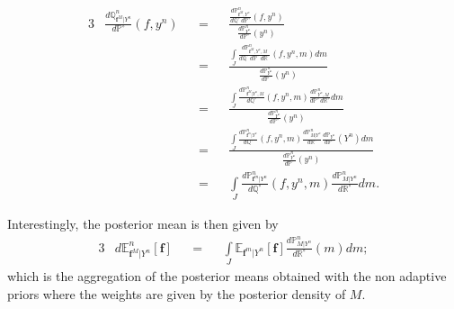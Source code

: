 \begin{alignat*}{3}
&\frac{d\mathds{Q}_{\boldsymbol{f}^{M} \vert Y^{n}}^{n}}{d\mathds{P}^{\circ}}(f, y^{n}) &&=&& \frac{\frac{d\mathds{P}_{\boldsymbol{f}^{M}, Y^{n}}^{n}}{d\mathds{Q}^{\circ} \, d\mathds{P}^{\circ}}(f, y^{n})}{\frac{d\mathds{P}_{Y^{n}}^{n}}{d \mathds{P}^{\circ}}(y^{n})}\\
& &&=&& \frac{\int\limits_{J} \frac{d\mathds{P}_{\boldsymbol{f}^{M}, Y^{n}, M}^{n}}{d\mathds{Q}^{\circ} \, d\mathds{P}^{\circ} \, d\mathds{R}^{\circ}}(f, y^{n}, m) dm}{\frac{d\mathds{P}_{Y^{n}}^{n}}{d \mathds{P}^{\circ}}(y^{n})}\\
& &&=&& \frac{\int\limits_{J} \frac{d\mathds{P}_{\boldsymbol{f}^{M} \vert Y^{n}, M}^{n}}{d\mathds{Q}^{\circ}}(f, y^{n}, m) \frac{d\mathds{P}_{Y^{n}, M}^{n}}{d\mathds{P}^{\circ} \, d\mathds{R}^{\circ}} dm}{\frac{d\mathds{P}_{Y^{n}}^{n}}{d \mathds{P}^{\circ}}(y^{n})}\\
& &&=&& \frac{\int\limits_{J} \frac{d\mathds{P}_{\boldsymbol{f}^{m} \vert Y^{n}}^{n}}{d\mathds{Q}^{\circ}}(f, y^{n}, m) \frac{d\mathds{P}_{M \vert Y^{n}}^{n}}{d\mathds{R}^{\circ}} \frac{d\mathds{P}_{Y^{n}}}{d\mathds{P}^{\circ}}(Y^{n}) dm}{\frac{d\mathds{P}_{Y^{n}}^{n}}{d \mathds{P}^{\circ}}(y^{n})}\\
& &&=&& \int\limits_{J} \frac{d\mathds{P}_{\boldsymbol{f}^{m} \vert Y^{n}}^{n}}{d\mathds{Q}^{\circ}}(f, y^{n}, m) \frac{d\mathds{P}_{M \vert Y^{n}}^{n}}{d\mathds{R}^{\circ}} dm.
\end{alignat*}

Interestingly, the posterior mean is then given by
\begin{alignat*}{3}
&d\mathds{E}_{\boldsymbol{f}^{M} \vert Y^{n}}^{n}[\boldsymbol{f}] &&=&& \int\limits_{J} \mathds{E}_{\boldsymbol{f}^{m} \vert Y^{n}}[\boldsymbol{f}] \frac{d\mathds{P}_{M \vert Y^{n}}^{n}}{d\mathds{R}^{\circ}}(m) dm;
\end{alignat*}
which is the aggregation of the posterior means obtained with the non adaptive priors where the weights are given by the posterior density of $M$.

